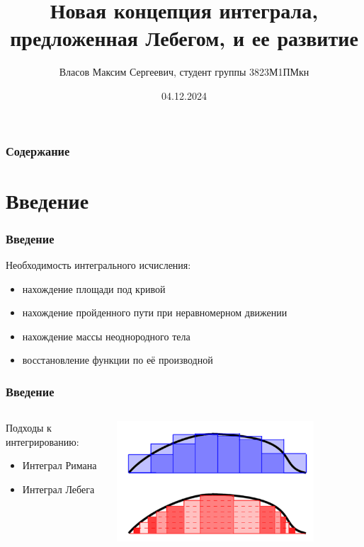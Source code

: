 \documentclass[aspectratio=169]{beamer}
\title{Новая концепция интеграла,\\предложенная Лебегом, и ее развитие}
\author{Власов Максим Сергеевич, студент группы 3823М1ПМкн}
\institute[ННГУ]{Нижегородский государственный университет им. Н.И. Лобачевского}
\date{04.12.2024}
\begin{document}
\begin{frame}
\maketitle
\end{frame}

\begin{frame}
\frametitle{Содержание}
\tableofcontents
\end{frame}

\section*{Введение}

\begin{frame}
\frametitle{Введение}
Необходимость интегрального исчисления:
\begin{itemize}
    \item нахождение площади под кривой
    \item нахождение пройденного пути при неравномерном движении
    \item нахождение массы неоднородного тела
    \item восстановление функции по её производной
\end{itemize}
\end{frame}

\begin{frame}
\frametitle{Введение}
\begin{columns}[c]
    \begin{column}{0.45\textwidth}
        Подходы к интегрированию:
        \begin{itemize}
            \item Интеграл Римана
            \item Интеграл Лебега
        \end{itemize}
    \end{column}
    \begin{column}{0.45\textwidth}
        \includegraphics[width=0.8\textwidth]{images/integral_intro.png}
    \end{column}
\end{columns}
\end{frame}
\end{document}
